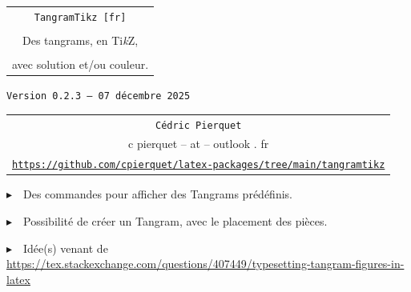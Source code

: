 \documentclass{article}
\def\TPversion{0.2.3}
\def\TPdate{07 décembre 2025}
\begin{document}
\pagestyle{fancy}

\thispagestyle{empty}

\vspace{2cm}

\begin{center}
	\begin{minipage}{0.75\linewidth}
	\begin{tcolorbox}[colframe=yellow,colback=yellow!15]
		\begin{center}
			\begin{tabular}{c}
				{\Huge \texttt{TangramTikz [fr]}}\\
				\\
				{\LARGE Des tangrams, en Ti\textit{k}Z}, \\
				\\
				{\LARGE avec solution et/ou couleur.} \\
			\end{tabular}
			
			\medskip
			
			{\small \texttt{Version \TPversion{} -- \TPdate}}
		\end{center}
	\end{tcolorbox}
\end{minipage}
\end{center}

\vspace{0.5cm}

\begin{center}
	\begin{tabular}{c}
	\texttt{Cédric Pierquet}\\
	{\ttfamily c pierquet -- at -- outlook . fr}\\
	\texttt{\url{https://github.com/cpierquet/latex-packages/tree/main/tangramtikz}}
\end{tabular}
\end{center}

\vspace{0.5cm}

{$\blacktriangleright$~~Des commandes pour afficher des Tangrams prédéfinis.}

\smallskip

{$\blacktriangleright$~~Possibilité de créer un Tangram, avec le placement des pièces.}

\smallskip

{$\blacktriangleright$~~Idée(s) venant de \url{https://tex.stackexchange.com/questions/407449/typesetting-tangram-figures-in-latex}}

\vspace{0.5cm}
\end{document}
